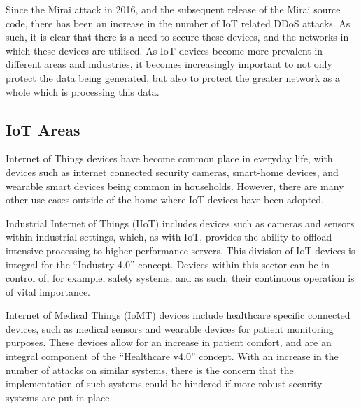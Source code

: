 Since the Mirai attack in 2016, and the subsequent release of the Mirai source
code, there has been an increase in the number of IoT related DDoS
attacks\cite{Salim2019}. As such, it is clear that there is a need to secure
these devices, and the networks in which these devices are utilised. As IoT
devices become more prevalent in different areas and industries, it becomes
increasingly important to not only protect the data being generated, but also to
protect the greater network as a whole which is processing this data.

\subsection{IoT Areas}

Internet of Things devices have become common place in everyday life, with
devices such as internet connected security cameras, smart-home devices, and
wearable smart devices being common in households. However, there are many other
use cases outside of the home where IoT devices have been adopted.

Industrial Internet of Things (IIoT) includes devices such as cameras and sensors
within industrial settings, which, as with IoT, provides the ability to offload
intensive processing to higher performance servers\cite{iiot_2019}. This division
of IoT devices is integral for the ``Industry 4.0'' concept. Devices within this
sector can be in control of, for example, safety systems, and as such, their
continuous operation is of vital importance.

Internet of Medical Things (IoMT) devices include healthcare specific connected
devices, such as medical sensors and wearable devices for patient monitoring
purposes\cite{iomt_2019}. These devices allow for an increase in patient comfort,
and are an integral component of the ``Healthcare v4.0'' concept. With an
increase in the number of attacks on similar systems, there is the concern that
the implementation of such systems could be hindered if more robust security
systems are put in place.
